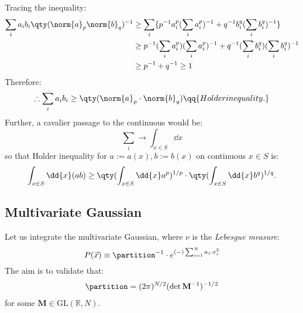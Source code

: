 Tracing the inequality: 
\begin{align*}
    \sum _{i}
    a_{i} b_{i} 
    \qty 
    (\norm{a} _{p}
    \norm{b} _{q}
    )^{-1}
& \geq 
    \sum_{i}
    \{  
    p^{-1}
    a _{i} ^{p}
    (
    \sum_{i}
    a_{i} ^{p}
    )^{-1}
+
    q^{-1}
    b _{i} ^{q}
    (
    \sum_{i}
    b_{i} ^{q}
    )^{-1} \}
\\
& \geq 
    p^{-1}
    (\sum_{i} 
    a_{i} ^{p})
    (\sum_{i} 
    a_{i} ^{p})^{-1}
+
    q^{-1}
    (\sum_{i} 
    b_{i} ^{q})
    (\sum_{i} 
    b_{i} ^{q})^{-1}
\\
& \geq 
    p^{-1} + q^{-1}
\geq 
    1
\end{align*}
Therefore:
\begin{align*}
    \therefore 
    \sum _{i} 
    a_{i} b_{i}
\geq 
    \qty 
    (\norm{a} _{p}
    \cdot 
    \norm{b} _{q} ) 
\qq
{Holder inequality.}
\end{align*}
Further, 
a cavalier passage 
to the continuous 
would be:
$$
    \sum_{i} 
    \rightarrow 
    \int_{x \in S} \dd{x}
$$ 
so that
Holder inequality 
for 
$a := a(x), 
b := b(x)$ 
on continuous  
$x\in S$ is:
\begin{gather*} 
    \int _{x\in S} 
    \dd{x} 
    ( a b ) 
\geq 
    \qty 
    (\int _{x\in S}
    \dd{x}
        a^{p}
    )^{1/p}
\cdot 
    \qty 
    (\int _{x\in S}
    \dd{x}
        b^{q}
    )^{1/q}
    .
\end{gather*}  

\subsection*
{Multivariate Gaussian}
Let us integrate 
the multivariate Gaussian, 
where $\nu$ is 
the {\it Lebesgue measure}:
$$
    P (\vec{x})
\equiv 
    \partition ^{-1} 
\cdot 
    e^ 
    { 
        (-) 
        \sum _{i=1} ^{N}
        a _{i} \cdot x _{i} ^{2}
    }
$$ 
The aim is to validate that: 
\begin{align*}
    \partition 
=
    (2 \pi) ^{N/2}
    (\det  
     \mathbf{M} ^{-1}) 
     ^{-1/2}
\end{align*}
for some 
$\mathbf{M} \in 
\text {GL} 
(\mathbb{R}, N)$. 

